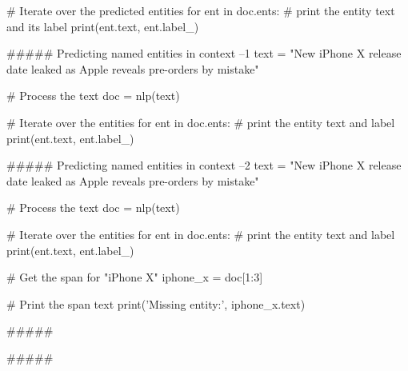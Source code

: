 # Iterate over the predicted entities
for ent in doc.ents:
    # print the entity text and its label
    print(ent.text, ent.label_)


##### Predicting named entities in context --1
text = "New iPhone X release date leaked as Apple reveals pre-orders by mistake"

# Process the text
doc = nlp(text)

# Iterate over the entities
for ent in doc.ents:
    # print the entity text and label
    print(ent.text, ent.label_)




##### Predicting named entities in context  --2
text = "New iPhone X release date leaked as Apple reveals pre-orders by mistake"

# Process the text
doc = nlp(text)

# Iterate over the entities
for ent in doc.ents:
    # print the entity text and label
    print(ent.text, ent.label_)

# Get the span for "iPhone X"
iphone_x = doc[1:3]

# Print the span text
print('Missing entity:', iphone_x.text)





##### 





##### 





